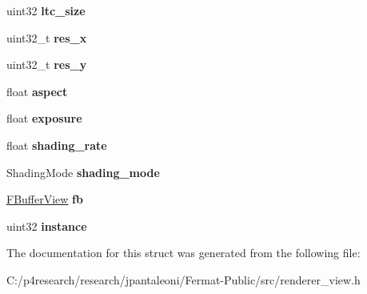 \begin{DoxyCompactItemize}
uint32 {\bfseries ltc\+\_\+size}
\item 
\mbox{\label{struct_renderer_view_a5ffef2d42c3cc2885fce73d191c2e8e0}} 
uint32\+\_\+t {\bfseries res\+\_\+x}
\item 
\mbox{\label{struct_renderer_view_a3c0a9ac2b53c54301859228bb01c0130}} 
uint32\+\_\+t {\bfseries res\+\_\+y}
\item 
\mbox{\label{struct_renderer_view_abced44902d9f50966356f58fbbd95269}} 
float {\bfseries aspect}
\item 
\mbox{\label{struct_renderer_view_adeffff82566ac0fce72f3a7e0b6bdae6}} 
float {\bfseries exposure}
\item 
\mbox{\label{struct_renderer_view_a5349df547e3295f3d2c270f89c6c4c38}} 
float {\bfseries shading\+\_\+rate}
\item 
\mbox{\label{struct_renderer_view_a21bd534ff71564412e5765fdcb6e67a6}} 
Shading\+Mode {\bfseries shading\+\_\+mode}
\item 
\mbox{\label{struct_renderer_view_a31153a847fb9e723718d1c666dc8ef13}} 
\hyperlink{struct_f_buffer_view}{F\+Buffer\+View} {\bfseries fb}
\item 
\mbox{\label{struct_renderer_view_afae46fb0424177a0e6e66f55fc320b14}} 
uint32 {\bfseries instance}
\end{DoxyCompactItemize}


The documentation for this struct was generated from the following file\+:\begin{DoxyCompactItemize}
\item 
C\+:/p4research/research/jpantaleoni/\+Fermat-\/\+Public/src/renderer\+\_\+view.\+h\end{DoxyCompactItemize}
